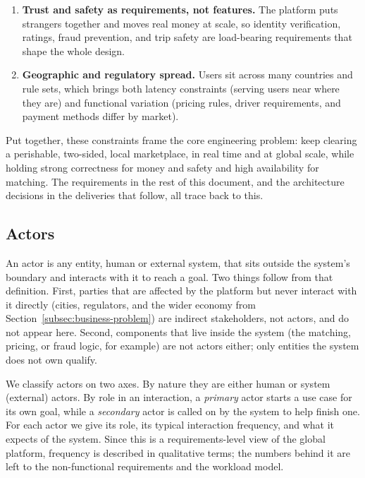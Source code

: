 \begin{enumerate}[leftmargin=1.6em,itemsep=0.2em]
  \item \textbf{Trust and safety as requirements, not features.} The platform
        puts strangers together and moves real money at scale, so identity
        verification, ratings, fraud prevention, and trip safety are
        load-bearing requirements that shape the whole design.

  \item \textbf{Geographic and regulatory spread.} Users sit across many
        countries and rule sets, which brings both latency constraints
        (serving users near where they are) and functional variation (pricing
        rules, driver requirements, and payment methods differ by market).
\end{enumerate}

Put together, these constraints frame the core engineering problem: keep
clearing a perishable, two-sided, local marketplace, in real time and at
global scale, while holding strong correctness for money and safety and high
availability for matching. The requirements in the rest of this document, and
the architecture decisions in the deliveries that follow, all trace back to
this.

\subsection{Actors}
\label{subsec:actors}

An actor is any entity, human or external system, that sits outside the
system's boundary and interacts with it to reach a goal. Two things follow
from that definition. First, parties that are affected by the platform but
never interact with it directly (cities, regulators, and the wider economy
from Section~\ref{subsec:business-problem}) are indirect stakeholders, not
actors, and do not appear here. Second, components that live inside the
system (the matching, pricing, or fraud logic, for example) are not actors
either; only entities the system does not own qualify.

We classify actors on two axes. By nature they are either human or system
(external) actors. By role in an interaction, a \emph{primary} actor starts a
use case for its own goal, while a \emph{secondary} actor is called on by the
system to help finish one. For each actor we give its role, its typical
interaction frequency, and what it expects of the system. Since this is a
requirements-level view of the global platform, frequency is described in
qualitative terms; the numbers behind it are left to the non-functional
requirements and the workload model.

